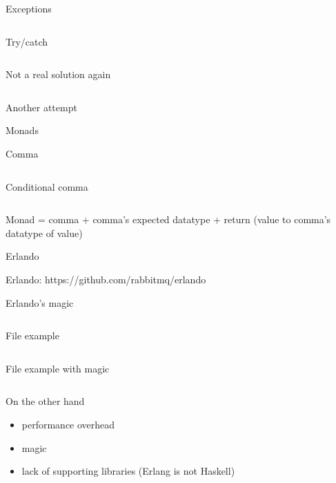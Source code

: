 \documentclass[10pt]{beamer}
\newcommand{\code}[4]{\inputminted[linenos, frame=none, firstline=#2, lastline=#3,
  framesep=10pt, bgcolor=lightgray]{#4}{#1}}
\begin{document}
\begin{frame}{Exceptions}
  \code{code.erl}{52}{55}{erlang}
\end{frame}

\begin{frame}{Try/catch}
  \code{code.erl}{57}{60}{erlang}
\end{frame}

\begin{frame}{Not a real solution again}
  \code{code.erl}{62}{68}{erlang}
\end{frame}

\begin{frame}{Another attempt}
  \begin{center}
    \Large
    Monads
  \end{center}
\end{frame}

\begin{frame}{Comma}
  \code{code.erl}{70}{72}{erlang}
\end{frame}

\begin{frame}{Conditional comma}
  \code{code.erl}{74}{78}{erlang}
  Monad = comma + comma's expected datatype + return (value to comma's datatype of value)
\end{frame}

\begin{frame}{Erlando}
  \begin{center}
    \Large
    Erlando: https://github.com/rabbitmq/erlando
  \end{center}
\end{frame}

\begin{frame}{Erlando's magic}
  \code{code.erl}{80}{84}{erlang}
\end{frame}

\begin{frame}{File example}
  \footnotesize
  \code{code.erl}{86}{108}{erlang}
\end{frame}

\begin{frame}{File example with magic}
  \small
  \code{code.erl}{110}{120}{erlang}
\end{frame}

\begin{frame}{On the other hand}
  \begin{itemize}
  \item performance overhead
  \item magic
  \item lack of supporting libraries (Erlang is not Haskell)
  \end{itemize}
\end{frame}
\end{document}
